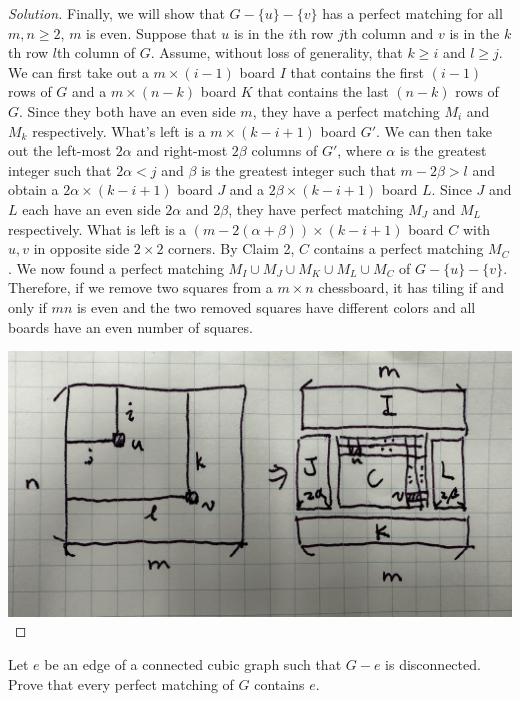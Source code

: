 \documentclass{article}
\newenvironment{problem}[2][Problem]{\begin{trivlist}
\item[\hskip \labelsep {\bfseries #1}\hskip \labelsep {\bfseries #2.}]}{\end{trivlist}}
\begin{document}
\begin{enumerate}[label=(\alph*)]
\begin{proof}[Solution]
        Finally, we will show that $G - \{u\} - \{v\}$ has a perfect matching for all $m, n \geq 2$, $m$ is even. Suppose that $u$ is in the $i$th row $j$th column and $v$ is in the $k$th row $l$th column of $G$. Assume, without loss of generality, that $k \geq i$ and $l \geq j$. We can first take out a $m \times (i - 1)$ board $I$ that contains the first $(i - 1)$ rows of $G$ and a $m \times (n - k)$ board $K$ that contains the last $(n - k)$ rows of $G$. Since they both have an even side $m$, they have a perfect matching $M_i$ and $M_k$ respectively. What's left is a $m \times (k - i + 1)$ board $G'$. We can then take out the left-most $2\alpha$ and right-most $2\beta$ columns of $G'$, where $\alpha$ is the greatest integer such that $2\alpha < j$ and $\beta$ is the greatest integer such that $m - 2\beta > l$ and obtain a $2\alpha \times (k - i + 1)$ board $J$ and a $2\beta \times (k - i + 1)$ board $L$. Since $J$ and $L$ each have an even side $2\alpha$ and $2\beta$, they have perfect matching $M_J$ and $M_L$ respectively. What is left is a $(m - 2(\alpha + \beta)) \times (k - i + 1)$ board $C$ with $u, v$ in opposite side $2 \times 2$ corners. By Claim 2, $C$ contains a perfect matching $M_C$. We now found a perfect matching $M_I \cup M_J \cup M_K \cup M_L \cup M_C$ of $G - \{u\} - \{v\}$. Therefore, if we remove two squares from a $m \times n$ chessboard, it has tiling if and only if $mn$ is even and the two removed squares have different colors and all boards have an even number of squares.
        
        \includegraphics[width=.93\textwidth]{Q382b3}
    \end{proof}
\end{enumerate}

\begin{problem}{3.8.3}
    Let $e$ be an edge of a connected cubic graph such that $G - e$ is disconnected. Prove that every perfect matching of $G$ contains $e$.
\end{problem}
\end{document}
